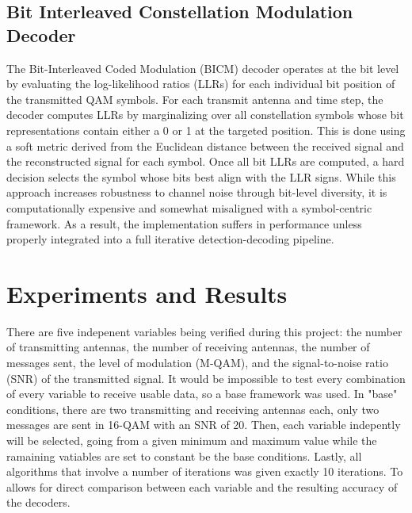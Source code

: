 \documentclass[conference]{IEEEtran}
\begin{document}
\subsection{Bit Interleaved Constellation Modulation Decoder}
The Bit-Interleaved Coded Modulation (BICM) decoder operates at the bit level by evaluating the log-likelihood ratios (LLRs) for each individual bit position of the transmitted QAM symbols. For each transmit antenna and time step, the decoder computes LLRs by marginalizing over all constellation symbols whose bit representations contain either a 0 or 1 at the targeted position. This is done using a soft metric derived from the Euclidean distance between the received signal and the reconstructed signal for each symbol. Once all bit LLRs are computed, a hard decision selects the symbol whose bits best align with the LLR signs. While this approach increases robustness to channel noise through bit-level diversity, it is computationally expensive and somewhat misaligned with a symbol-centric framework. As a result, the implementation suffers in performance unless properly integrated into a full iterative detection-decoding pipeline.

\section{Experiments and Results}
There are five indepenent variables being verified during this project: the number of transmitting antennas, the number of receiving antennas, the number of messages sent, the level of modulation (M-QAM), and the signal-to-noise ratio (SNR) of the transmitted signal. It would be impossible to test every combination of every variable to receive usable data, so a base framework was used. In "base" conditions, there are two transmitting and receiving antennas each, only two messages are sent in 16-QAM with an SNR of 20. Then, each variable indepently will be selected, going from a given minimum and maximum value while the ramaining vatiables are set to constant be the base conditions. Lastly, all algorithms that involve a number of iterations was given exactly 10 iterations. To allows for direct comparison between each variable and the resulting accuracy of the decoders.
\end{document}
